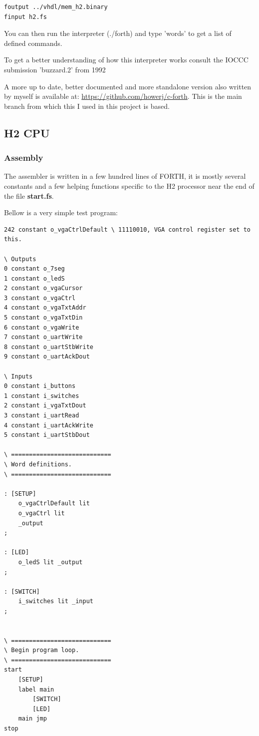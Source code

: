 \documentclass	[a4paper, 10pt]	{article}
\begin{document}
      \begin{verbatim}
foutput ../vhdl/mem_h2.binary
finput h2.fs
      \end{verbatim}     
       
      You can then run the interpreter (./forth) and type 'words' to get a list of
      defined commands.

      To get a better understanding of how this interpreter works consult the
      IOCCC submission 'buzzard.2' from 1992 \cite{ioccc}

      A more up to date, better documented and more standalone version also
      written by myself is available at: \url{https://github.com/howerj/c-forth}.
      This is the main branch from which this I used in this project is
      based.

    \subsection{H2 CPU}

      \subsubsection{Assembly}

    The assembler is written in a few hundred lines of FORTH, it is mostly
    several constants and a few helping functions specific to the H2 processor
    near the end of the file \textbf{start.fs}.

    Bellow is a very simple test program:

\begin{verbatim}
242 constant o_vgaCtrlDefault \ 11110010, VGA control register set to this.

\ Outputs
0 constant o_7seg
1 constant o_ledS
2 constant o_vgaCursor
3 constant o_vgaCtrl
4 constant o_vgaTxtAddr
5 constant o_vgaTxtDin
6 constant o_vgaWrite
7 constant o_uartWrite
8 constant o_uartStbWrite
9 constant o_uartAckDout

\ Inputs
0 constant i_buttons
1 constant i_switches
2 constant i_vgaTxtDout
3 constant i_uartRead
4 constant i_uartAckWrite
5 constant i_uartStbDout

\ ============================
\ Word definitions.
\ ============================

: [SETUP]
    o_vgaCtrlDefault lit
    o_vgaCtrl lit 
    _output
;

: [LED]
    o_ledS lit _output
;

: [SWITCH]
    i_switches lit _input
;


\ ============================
\ Begin program loop.
\ ============================
start
    [SETUP]
    label main
        [SWITCH]
        [LED]
    main jmp
stop
\end{verbatim}
\end{document}

